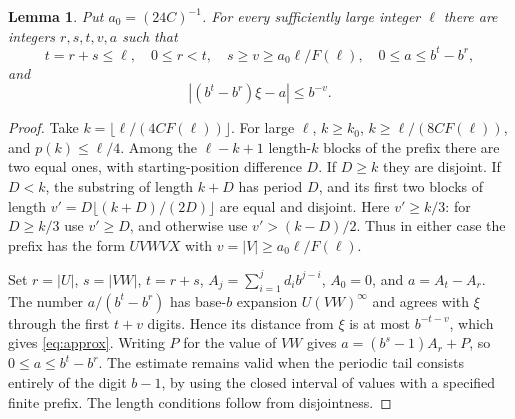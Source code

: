 \documentclass[11pt]{article}
\numberwithin{equation}{section}
\newtheorem{lemma}[theorem]{Lemma}
\theoremstyle{remark}\newtheorem{remark}[theorem]{Remark}
\begin{document}
\begin{lemma}\label{lem:words}
Put $a_0=(24C)^{-1}$. For every sufficiently large integer $\ell$
there are integers $r,s,t,v,a$ such that
\begin{equation}\label{eq:repeat}
 t=r+s\le\ell,\quad 0\le r<t,\quad s\ge v\ge a_0\ell/F(\ell),
 \quad 0\le a\le b^t-b^r,
\end{equation}
and
\begin{equation}\label{eq:approx}
 |(b^t-b^r)\xi-a|\le b^{-v}.
\end{equation}
\end{lemma}
\begin{proof}
Take $k=\lfloor\ell/(4CF(\ell))\rfloor$. For large $\ell$,
$k\ge k_0$, $k\ge\ell/(8CF(\ell))$, and $p(k)\le\ell/4$.
Among the $\ell-k+1$ length-$k$ blocks of the prefix there are two equal
ones, with starting-position difference $D$.
If $D\ge k$ they are disjoint. If $D<k$, the substring of length $k+D$
has period $D$, and its first two blocks of length
$v'=D\lfloor(k+D)/(2D)\rfloor$ are equal and disjoint.
Here $v'\ge k/3$: for $D\ge k/3$ use $v'\ge D$, and otherwise use
$v'>(k-D)/2$. Thus in either case the prefix has the form $UVWVX$
with $v=|V|\ge a_0\ell/F(\ell)$.

Set $r=|U|$, $s=|VW|$, $t=r+s$,
$A_j=\sum_{i=1}^jd_ib^{j-i}$, $A_0=0$, and $a=A_t-A_r$.
The number $a/(b^t-b^r)$ has base-$b$ expansion $U(VW)^\infty$ and agrees
with $\xi$ through the first $t+v$ digits. Hence its distance from
$\xi$ is at most $b^{-t-v}$, which gives \eqref{eq:approx}.
Writing $P$ for the value of $VW$ gives
$a=(b^s-1)A_r+P$, so $0\le a\le b^t-b^r$.
The estimate remains valid when the periodic tail consists entirely
of the digit $b-1$, by using the closed interval of values with a
specified finite prefix.
The length conditions follow from disjointness.
\end{proof}
\end{document}
